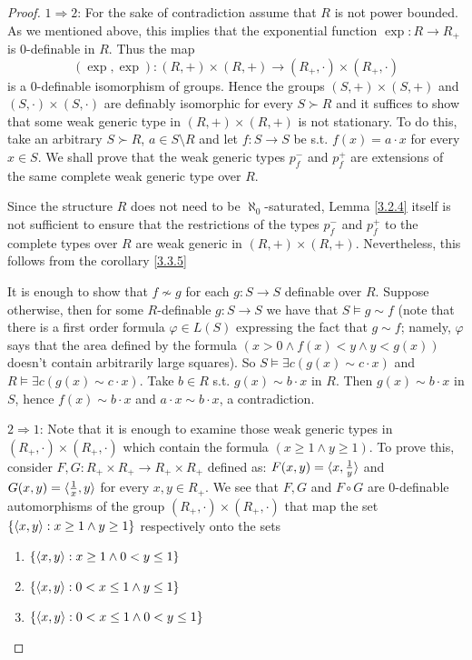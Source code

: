 \documentclass[11pt]{article}
\begin{document}
\begin{proof}
\(1\Rightarrow 2\): For the sake of contradiction assume that \(R\) is not power bounded. As we mentioned
above, this implies that the exponential function \(\exp:R\to R_+\) is 0-definable in \(R\). Thus
the map
\begin{equation*}
(\exp,\exp):(R,+)\times(R,+)\to(R_+,\cdot)\times(R_+,\cdot)
\end{equation*}
is a 0-definable isomorphism of groups. Hence the groups \((S,+)\times(S,+)\) and \((S,\cdot)\times(S,\cdot)\) are
definably isomorphic for every \(S\succ R\) and it suffices to show that some weak generic type
in \((R,+)\times(R,+)\) is not stationary. To do this, take an arbitrary \(S\succ R\), \(a\in S\setminus R\) and
let \(f:S\to S\) be s.t. \(f(x)=a\cdot x\) for every \(x\in S\). We shall prove that the weak generic
types \(p_f^-\) and \(p_f^+\) are extensions of the same complete weak generic type over \(R\).

Since the structure \(R\) does not need to be \(\aleph_0\)-saturated, Lemma \ref{3.2.4} itself is not
sufficient to ensure that the restrictions of the types \(p_f^-\) and \(p_f^+\) to the complete
types over \(R\) are weak generic in \((R,+)\times(R,+)\). Nevertheless, this follows from the
corollary \ref{3.3.5}

It is enough to show that \(f\not\sim g\) for each \(g:S\to S\) definable over \(R\). Suppose
otherwise, then for some \(R\)-definable \(g:S\to S\) we have that \(S\vDash g\sim f\) (note that there is
a first order formula \(\varphi\in L(S)\) expressing the fact that \(g\sim f\); namely, \(\varphi\) says that the
area defined by the formula \((x>0\wedge f(x)<y\wedge y<g(x))\) doesn't contain arbitrarily large
squares). So \(S\vDash\exists c(g(x)\sim c\cdot x)\) and \(R\vDash\exists c(g(x)\sim c\cdot x)\). Take \(b\in R\) s.t. \(g(x)\sim b\cdot x\)
in \(R\). Then \(g(x)\sim b\cdot x\) in \(S\), hence \(f(x)\sim b\cdot x\) and \(a\cdot x\sim b\cdot x\), a contradiction.

\(2\Rightarrow 1\): Note that it is enough to examine those weak generic types in \((R_+,\cdot)\times(R_+,\cdot)\) which
contain the formula \((x\ge 1\wedge y\ge 1)\). To prove this, consider \(F,G:R_+\times R_+\to R_+\times R_+\) defined
as: \(F(x,y)=\langle x,\frac{1}{y}\rangle\) and \(G(x,y)=\langle\frac{1}{x},y\rangle\) for every \(x,y\in R_+\). We see
that \(F,G\) and \(F\circ G\) are 0-definable automorphisms of the group \((R_+,\cdot)\times(R_+,\cdot)\) that map
the set \(\{\langle x,y\rangle:x\ge 1\wedge y\ge 1\}\) respectively onto the sets
\begin{enumerate}
\item \(\{\langle x,y\rangle:x\ge 1\wedge 0<y\le 1\}\)
\item \(\{\langle x,y\rangle:0<x\le 1\wedge y\le 1\}\)
\item \(\{\langle x,y\rangle:0<x\le 1\wedge 0<y\le 1\}\)
\end{enumerate}


\end{proof}
\end{document}
